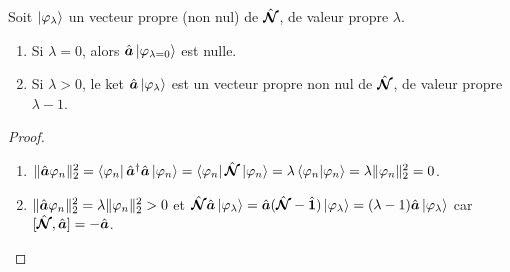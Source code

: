 \begin{Lemm}
Soit $\ket{\varphi_\lambda}$ un vecteur propre (non nul) de $\hat{\bm{\mathcal N}}$, de valeur propre $\lambda$.
    \begin{enumerate}[label = \roman*)]
        \item Si $\lambda = 0$, alors $\hat{\bm{a}} \ket{\varphi_{\lambda = 0}}$ est nulle.
        \item  Si $\lambda > 0$, le ket $\hat{\bm{a}} \ket{\varphi_{\lambda}}$ est un vecteur propre non nul de $\hat{\bm{\mathcal N}}$, de valeur propre $\lambda -1$.
    \end{enumerate}
\end{Lemm}
\begin{proof}
    \begin{enumerate}[label = \roman*)]
        \item $\Vert \hat{\bm{a}} \varphi_n \Vert_2^2 = \bra{\varphi_n} \hat{\bm{a}}^\dag \hat{\bm{a}}\ket{\varphi_n} = \bra{\varphi_n}\hat{\bm{\mathcal N}}\ket{\varphi_n} = \lambda \braket{\varphi_n \vert \varphi_n} = \lambda \Vert \varphi_n \Vert_2^2= 0$.
        \item $\Vert \hat{\bm{a}} \varphi_n \Vert_2^2 = \lambda \Vert \varphi_n \Vert_2^2 > 0$ et $\hat{\bm{\mathcal N}} \hat{\bm{a}}\ket{\varphi_\lambda} = \hat{\bm{a}} (\hat{\bm{\mathcal N}} - \hat{\bm{1}}) \ket{\varphi_\lambda} = (\lambda -1 )\hat{\bm{a}} \ket{\varphi_\lambda}$ car $[\hat{\bm{\mathcal N}} , \hat{\bm{a}}] = - \hat{\bm{a}}$.
    \end{enumerate}
\end{proof}

